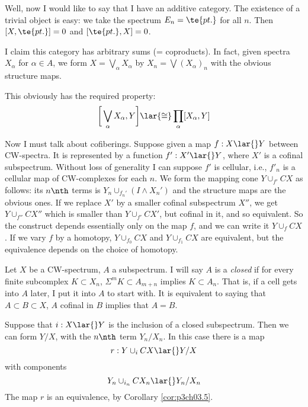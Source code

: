 \documentclass[../main]{subfiles}
\begin{document}
Well, now I would like to say that I have an additive category. The
existence of a trivial object is easy: we take the spectrum $E_n=\te{pt.}$ for all $n$. Then $[X,\te{pt.}]=0$ and $[\te{pt.},X]=0 $.

I claim this category has arbitrary sums (= coproducts). In fact,
given spectra $X_\alpha$ for $\alpha\in A$, we form $X=\bigvee_\alpha X_\alpha$ by $X_n=\bigvee (X_\alpha)_n$ with the obvious structure maps.


This obviously has the required property:
\[\bigg[\bigvee_\alpha X_\alpha,Y\bigg] \lar{\cong} \prod_\alpha [X_\alpha,Y] \]

Now I must talk about cofiberings. Suppose given a map $f:X\lar{}Y$ between CW-spectra. It is represented by a function $f':X'\lar{}Y$, where $X'$ is a cofinal subspectrum. Without loss of generality I can suppose $f'$ is cellular, i.e., $f'_n$ is a cellular map of CW-complexes for each $n$. We form the mapping cone $Y\cup_{f'} CX$ as follows: its $n\nth$ terms is $Y_n \cup_{f_n'} (I\wedge X_n')$ and the structure maps are the obvious ones. If we replace $X'$ by a smaller cofinal subspectrum $X''$, we get $Y\cup_{f''} CX''$ which is smaller than $Y\cup_{f'} CX'$, but cofinal in it, and so equivalent. So the construct depends essentially only on the map $f$, and we can write it $Y\cup_f CX$. If we vary $f$ by a homotopy, $Y\cup_{f_0} CX$ and $Y\cup_{f_1} CX$ are equivalent, but the equivalence depends on the choice of homotopy.

Let $X$ be a CW-spectrum, $A$ a subspectrum. I will say $A$ is a \emph{closed}  if for every finite subcomplex $K\subset X_n$, $\Sigma^mK\subset A_{m+n}$ implies $K\subset A_n$. That is, if a cell gets into $A$ later, I put it into $A$ to start with. It is equivalent to saying that $A\subset B\subset X$, $A$ cofinal in $B$ implies that $A=B$.

Suppose that $i:X\lar{}Y$ is the inclusion of a closed subspectrum. Then we can form $Y/X$, with the $n\nth$ term $Y_n/X_n$. In this case there is a map \[r:Y\cup_i CX\lar{} Y/X \]
with components \[Y_n\cup_{i_n} CX_n \lar{} Y_n/X_n \]
The map $r$ is an equivalence, by Corollary \ref{cor:p3ch03.5}.
\end{document}
